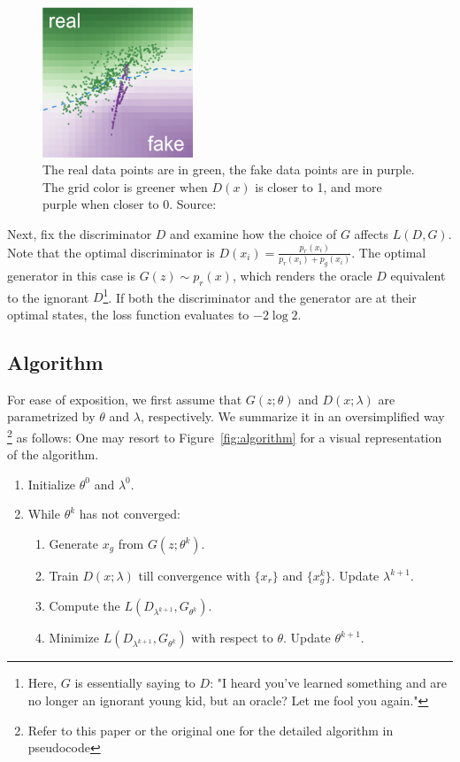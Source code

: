 \documentclass[12pt]{article}
\begin{document}
\begin{figure}[!htbp]
    \centering
    \includegraphics[width=0.4\textwidth]{../Figures/Discriminator.png}
    \caption{The real data points are in green, the fake data points are in purple. The grid color is greener when $D(x)$ is closer to 1, and more purple when closer to 0. Source: \citet{kahng2018gan}}
    \label{fig:discriminator}
\end{figure}

Next, fix the discriminator \(D\) and examine how the choice of \(G\) affects
\(L(D, G)\). Note that the optimal discriminator is \(D(x_i) =
\frac{p_r(x_i)}{p_r(x_i) + p_g(x_i)}\). The optimal generator in this case is
\(G(z) \sim p_r(x)\), which renders the oracle \(D\) equivalent to the ignorant
\(D\)\footnote{Here, \(G\) is essentially saying to \(D\): "I heard you've
    learned something and are no longer an ignorant young kid, but an oracle? Let
    me fool you again."}. If both the discriminator and the generator are at their
optimal states, the loss function evaluates to \(-2\log 2\).

\subsection{Algorithm} \label{subsec:algorithm}

For ease of exposition, we first assume that $G(z;\theta)$ and $D(x;\lambda)$
are parametrized by $\theta$ and $\lambda$, respectively. We summarize it in an
oversimplified way \footnote{Refer to this paper \citet{kaji2023adversarial} or
    the original one \citet{goodfellow2014generative} for the detailed algorithm in
    pseudocode} as follows: One may resort to Figure~\ref{fig:algorithm} for a
visual representation of the algorithm.
\begin{enumerate}
    \item Initialize $\theta^0$ and $\lambda^0$.
    \item While $\theta^k$ has not converged:
          \begin{enumerate}
              \item Generate $x_g$ from $G(z;\theta^k)$.
              \item Train $D(x;\lambda)$ till convergence with $\{x_r\}$ and $\{x^k_g\}$. Update
                    $\lambda^{k+1}$.
              \item Compute the $L(D_{\lambda^{k+1}},G_{\theta^k})$.
              \item Minimize $L(D_{\lambda^{k+1}},G_{\theta^k})$ with respect to $\theta$. Update
                    $\theta^{k+1}$.
          \end{enumerate}
\end{enumerate}
\end{document}
